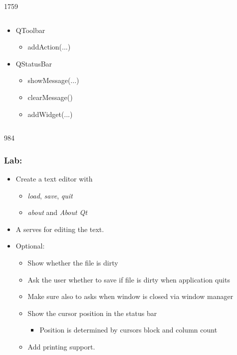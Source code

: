 \begin{slide}{1759}
\begin{columns}[t]
\begin{column}[T]{5cm}
\begin{itemize}
     \item QToolbar
        \begin{itemize}
        \item addAction(...)
        \end{itemize}
        
      \item QStatusBar
        \begin{itemize}
        \item showMessage(...)
        \item clearMessage()
        \item addWidget(...)
        \end{itemize}
      \end{itemize}
    \end{column}
  \end{columns}
\end{slide}

\begin{slide}{984}
  \frametitle{Lab: }
\begin{itemize}
\item Create a text editor with
  \begin{itemize}
  \item \emph{load}, \emph{save}, \emph{quit}
  \item \emph{about} and \emph{About Qt}
  \end{itemize}
\item A  serves for editing the text.
\item Optional:
  \begin{itemize}
  \item Show whether the file is dirty
  \item Ask the user whether to save if file is dirty when application quits
  \item Make sure also to asks when window is closed via window manager
  \item Show the cursor position in the status bar
    \begin{itemize}
    \item Position is determined by cursors block and column count 
    \end{itemize}
  \item Add printing support. 
  \end{itemize}
\end{itemize}
\vfill
\end{slide}
